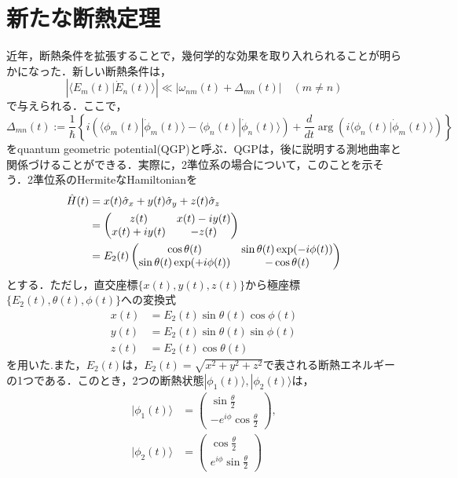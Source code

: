 \section{新たな断熱定理}
近年，断熱条件を拡張することで，幾何学的な効果を取り入れられることが明らかになった\cite{Wu2008}．新しい断熱条件は，
\begin{equation}
  \left| \langle E_m(t) | \Dot{E}_n(t) \rangle \right| \ll \left| \omega_{nm}(t) + \Delta_{mn}(t) \right| \quad (m\ne n) 
\end{equation}
で与えられる．ここで，
\begin{equation}
  \Delta_{mn}(t) := \frac{1}{\hbar} \left\{ i \left( \langle \phi_m(t) | \Dot{\phi}_m(t) \rangle - \langle \phi_n(t) | \Dot{\phi}_n(t) \rangle \right)+ \frac{d}{dt} \arg \left( i \langle \phi_n(t) | \Dot{\phi}_m(t) \rangle \right) \right\}
\end{equation}
をquantum geometric potential(QGP)と呼ぶ．QGPは，後に説明する測地曲率と関係づけることができる．実際に，2準位系の場合について，このことを示そう．2準位系のHermiteなHamiltonianを
\begin{align}
  \Hat{H}(t)
  &= x(t)\Hat{\sigma}_x + y(t) \Hat{\sigma}_y + z(t) \Hat{\sigma}_z\\
  &=
  \begin{pmatrix} 
    z(t) & x(t) - iy(t)\\
    x(t) + iy(t) & -z(t)\\
  \end{pmatrix}\\
  &= E_2(t)
  \begin{pmatrix} 
    \cos \theta(t) & \sin \theta(t) \exp(-i\phi(t))\\
    \sin \theta(t) \exp(+i\phi(t)) & -\cos \theta(t)\\
  \end{pmatrix}
\end{align}
とする．ただし，直交座標$\{x(t), y(t), z(t)\}$から極座標$\{E_2(t), \theta(t), \phi(t)\}$への変換式
\begin{align}
  x(t) &= E_2(t) \sin \theta(t) \cos \phi(t)\\
  y(t) &= E_2(t) \sin \theta(t) \sin \phi(t)\\
  z(t) &= E_2(t) \cos \theta(t)
\end{align}
を用いた.また，$E_2(t)$は，$E_2(t) = \sqrt{x^2 + y^2 + z^2}$で表される断熱エネルギーの1つである．このとき，2つの断熱状態$|\phi_1(t) \rangle, |\phi_2(t) \rangle$は，
\begin{align}
  |\phi_1(t) \rangle
  &= 
  \begin{pmatrix}
    \sin \frac{\theta}{2}\\
    -e^{i\phi} \cos \frac{\theta}{2}
  \end{pmatrix},\\
  |\phi_2(t) \rangle
  &=
  \begin{pmatrix}
    \cos \frac{\theta}{2}\\
    e^{i\phi} \sin \frac{\theta}{2}
  \end{pmatrix}
\end{align}
